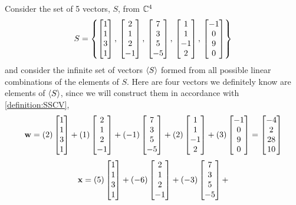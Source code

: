 \documentclass{ximera}
\begin{document}
\begin{example}
  Consider the set of 5 vectors, $S$, from $\mathbb{C}^{4}$
  \[
    S=\left\{
      \begin{bmatrix}1 \\ 1 \\ 3 \\ 1\end{bmatrix},\,
      \begin{bmatrix}2 \\ 1 \\ 2 \\ -1\end{bmatrix},\,
      \begin{bmatrix}7 \\ 3 \\ 5 \\ -5\end{bmatrix},\,
      \begin{bmatrix}1 \\ 1 \\ -1 \\ 2\end{bmatrix},\,
      \begin{bmatrix}-1 \\ 0 \\ 9 \\ 0\end{bmatrix}
    \right\}
  \]
  and consider the infinite set of vectors $\left\langle S\right\rangle$ formed from all
  possible linear combinations of the elements of $S$.  Here are four
  vectors we definitely know are elements of $\left\langle S\right\rangle$, since we will
  construct them in accordance with \ref{definition:SSCV},
  \[
    \mathbf{w}=
    (2)\begin{bmatrix}1 \\ 1 \\ 3 \\ 1\end{bmatrix}+
    (1)\begin{bmatrix}2 \\ 1 \\ 2 \\ -1\end{bmatrix}+
    (-1)\begin{bmatrix}7 \\ 3 \\ 5 \\ -5\end{bmatrix}+
    (2)\begin{bmatrix}1 \\ 1 \\ -1 \\ 2\end{bmatrix}+
    (3)\begin{bmatrix}-1 \\ 0 \\ 9 \\ 0\end{bmatrix}
    =
    \begin{bmatrix}-4\\2\\28\\10\end{bmatrix}
  \]
  \[
    \mathbf{x}=
    (5)\begin{bmatrix}1 \\ 1 \\ 3 \\ 1\end{bmatrix}+
    (-6)\begin{bmatrix}2 \\ 1 \\ 2 \\ -1\end{bmatrix}+
    (-3)\begin{bmatrix}7 \\ 3 \\ 5 \\ -5\end{bmatrix}+
\]
\end{example}
\end{document}
